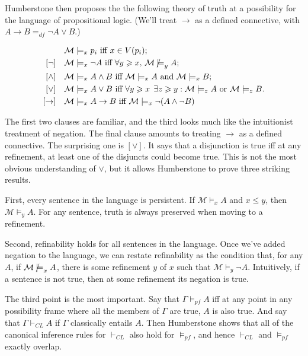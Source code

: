 \documentclass[
  11pt,
  letterpaper,
  DIV=11,
  numbers=noendperiod,
  twoside]{scrartcl}
\newcommand{\nmodels}{\mathrel{\ooalign{$\models$\cr\raisebox{-0.001ex}{\hss$\mkern-1mu/\hss$}}}}
\begin{document}
Humberstone then proposes the the following theory of truth at a
possibility for the language of propositional logic. (We'll treat
\(\rightarrow\) as a defined connective, with
\(A \rightarrow B =_{df} \neg A \vee B\).)

\begin{align*}
[\text{Vbls}] \quad & \mathcal{M} \models_x p_i \text{ iff } x \in V(p_i); \\
[\neg] \quad & \mathcal{M} \models_x \neg A \text{ iff } \forall y \geqslant x, \, \mathcal{M} \nmodels_y  A; \\
[\wedge] \quad & \mathcal{M} \models_x A \wedge B \text{ iff } \mathcal{M} \models_x A \text{ and } \mathcal{M} \models_x B; \\
[\vee] \quad & \mathcal{M} \models_x A \vee B \text{ iff } \forall y \geqslant x \;\, \exists z \geqslant y : \mathcal{M} \models_z A \text{ or } \mathcal{M} \models_z B. \\
[\rightarrow] \quad & \mathcal{M} \models_x A \rightarrow B \text{ iff } \mathcal{M} \models_x \neg(A \wedge \neg B)
\end{align*}

The first two clauses are familiar, and the third looks much like the
intuitionist treatment of negation. The final clause amounts to treating
\(\rightarrow\) as a defined connective. The surprising one is
\([\vee]\). It says that a disjunction is true iff at any refinement, at
least one of the disjuncts could become true. This is not the most
obvious understanding of \(\vee\), but it allows Humberstone to prove
three striking results.

First, every sentence in the language is persistent. If
\(\mathcal{M} \models_x A\) and \(x \leqslant y\), then
\(\mathcal{M} \models_y A\). For any sentence, truth is always preserved
when moving to a refinement.

Second, refinability holds for all sentences in the language. Once we've
added negation to the language, we can restate refinability as the
condition that, for any \(A\), if \(\mathcal{M} \nmodels_x A\), there is
some refinement \(y\) of \(x\) such that
\(\mathcal{M} \models_y \neg A\). Intuitively, if a sentence is not
true, then at some refinement its negation is true.

The third point is the most important. Say that \(\Gamma \vDash_{pf} A\)
iff at any point in any possibility frame where all the members of
\(\Gamma\) are true, \(A\) is also true. And say that
\(\Gamma \vdash_{CL} A\) if \(\Gamma\) classically entails \(A\). Then
Humberstone shows that all of the canonical inference rules for
\(\vdash_{CL}\) also hold for \(\vDash_{pf}\), and hence \(\vdash_{CL}\)
and \(\vDash_{pf}\) exactly overlap.
\end{document}

